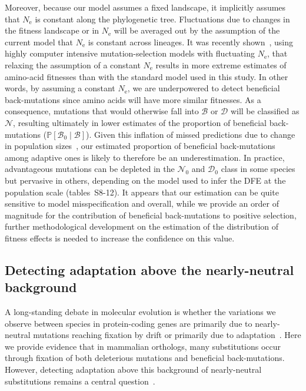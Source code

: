 \documentclass[9pt,twocolumn,twoside,lineno]{pnas-new}
\newcommand{\Ne}{N_{\text{e}}}
\newcommand{\proba}{\mathbb{P}}
\newcommand{\SphyDel}{\mathcal{D}_0}
\newcommand{\SphyNeu}{\mathcal{N}_0}
\newcommand{\SphyBen}{\mathcal{B}_0}
\newcommand{\given}{\mid}
\newcommand{\SpopDel}{\mathcal{D}}
\newcommand{\SpopNeu}{\mathcal{N}}
\newcommand{\SpopBen}{\mathcal{B}}
\begin{document}
Moreover, because our model assumes a fixed landscape, it implicitly assumes that $\Ne$ is constant along the phylogenetic tree.
Fluctuations due to changes in the fitness landscape or in $\Ne$ will be averaged out by the assumption of the current model that $\Ne$ is constant across lineages.
It was recently shown~\cite{latrille_inferring_2021}, using highly computer intensive mutation-selection models with fluctuating $\Ne$, that relaxing the assumption of a constant $\Ne$ results in more extreme estimates of amino-acid fitnesses than with the standard model used in this study.
In other words, by assuming a constant $\Ne$, we are underpowered to detect beneficial back-mutations since amino acids will have more similar fitnesses.
As a consequence, mutations that would otherwise fall into $\SpopBen$ or $\SpopDel$ will be classified as $\SpopNeu$, resulting ultimately in lower estimates of the proportion of beneficial back-mutations ($\proba [ \SphyBen  \given  \SpopBen]$).
Given this inflation of missed predictions due to change in population sizes~\cite{lanfear_population_2014, jones_shifting_2017, platt_protein_2018}, our estimated proportion of beneficial back-mutations among adaptive ones is likely to therefore be an underestimation.
In practice, advantageous mutations can be depleted in the $\SphyNeu$ and $\SphyDel$ class in some species but pervasive in others, depending on the model used to infer the DFE at the population scale (tables~S8-12).
It appears that our estimation can be quite sensitive to model misspecification and overall, while we provide an order of magnitude for the contribution of beneficial back-mutations to positive selection, further methodological development on the estimation of the distribution of fitness effects is needed to increase the confidence on this value.

\subsection*{Detecting adaptation above the nearly-neutral background}

A long-standing debate in molecular evolution is whether the variations we observe between species in protein-coding genes are primarily due to nearly-neutral mutations reaching fixation by drift or primarily due to adaptation~\cite{kimura_evolutionary_1968,jensen_importance_2019,gillespie_substitution_1994,Ohta1992}.
Here we provide evidence that in mammalian orthologs, many substitutions occur through fixation of both deleterious mutations and beneficial back-mutations.
However, detecting adaptation above this background of nearly-neutral substitutions remains a central question~\cite{kimura_evolutionary_1968,ohta_development_1996}.
\end{document}
